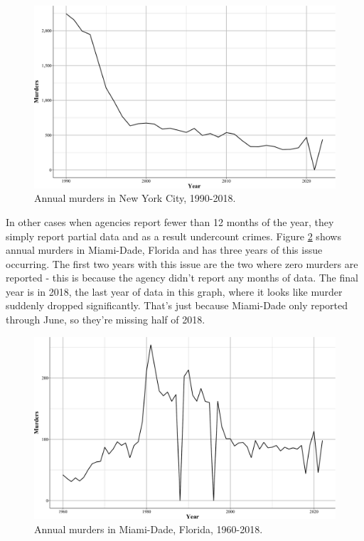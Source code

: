 \documentclass[
  12pt,
  openany]{book}
\begin{document}
\begin{figure}

{\centering \includegraphics[width=0.9\linewidth]{ucrbook_files/figure-latex/nycMurderYearly-1} 

}

\caption{Annual murders in New York City, 1990-2018.}\label{fig:nycMurderYearly}
\end{figure}

In other cases when agencies report fewer than 12 months of the year, they simply report partial data and as a result undercount crimes. Figure \ref{fig:miamiDadeMurderAnnual} shows annual murders in Miami-Dade, Florida and has three years of this issue occurring. The first two years with this issue are the two where zero murders are reported - this is because the agency didn't report any months of data. The final year is in 2018, the last year of data in this graph, where it looks like murder suddenly dropped significantly. That's just because Miami-Dade only reported through June, so they're missing half of 2018.

\begin{figure}

{\centering \includegraphics[width=0.9\linewidth]{ucrbook_files/figure-latex/miamiDadeMurderAnnual-1} 

}

\caption{Annual murders in Miami-Dade, Florida, 1960-2018.}\label{fig:miamiDadeMurderAnnual}
\end{figure}
\end{document}
